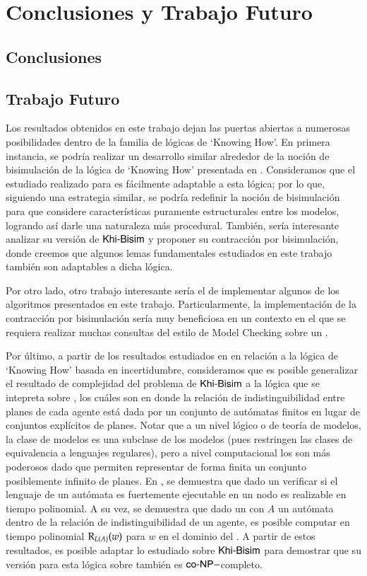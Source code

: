 \chapter{Conclusiones y Trabajo Futuro}

\section{Conclusiones}


\section{Trabajo Futuro}

Los resultados obtenidos en este trabajo dejan las puertas abiertas a numerosas posibilidades dentro de la familia de lógicas de `Knowing How'. 
En primera instancia, se podría realizar un desarrollo similar alrededor de la noción de bisimulación de la lógica de `Knowing How' presentada 
en \cite{Wang15KH,Wang2018GoalDirectedKH}. Consideramos que el estudiado realizado para \KHilogic es fácilmente adaptable a esta lógica; por lo que, siguiendo 
una estrategia similar, se podría redefinir la noción de bisimulación para que considere características puramente estructurales entre los modelos, 
logrando así darle una naturaleza más procedural. También, sería interesante analizar su versión de $\rm\textsf{Khi-Bisim}$ y proponer su contracción 
por bisimulación, donde creemos que algunos lemas fundamentales estudiados en este trabajo también son adaptables a dicha lógica.

Por otro lado, otro trabajo interesante sería el de implementar algunos de los algoritmos presentados en este trabajo. Particularmente, 
la implementación de la contracción por bisimulación sería muy beneficiosa en un contexto en el que se requiera realizar muchas consultas del 
estilo de Model Checking sobre un \ults.

Por último, a partir de los resultados estudiados en \cite{Demri_Fervari_2023} en relación a la lógica de `Knowing How' basada en incertidumbre, 
consideramos que es posible generalizar el resultado de complejidad del problema de $\rm\textsf{Khi-Bisim}$ a la lógica que se intepreta sobre \regults, los 
cuáles son \ults en donde la relación de indistinguibilidad entre planes de cada agente está dada por un conjunto de autómatas finitos en lugar 
de conjuntos explícitos de planes. 
Notar que a un nivel lógico o de teoría de modelos, la clase de modelos \regults es una subclase de los modelos \ults (pues restringen las clases de equivalencia 
a lenguajes regulares), pero a nivel computacional los \regults son más poderosos dado que permiten representar de forma finita un conjunto 
posiblemente infinito de planes. En \cite{Demri_Fervari_2023}, se demuestra que dado un \regults verificar si el lenguaje de un autómata 
es fuertemente ejecutable en un nodo es realizable en tiempo polinomial. A su vez, se demuestra que dado un \regults con $A$ un autómata dentro de la relación de indistinguibilidad de 
un agente, es posible computar en tiempo polinomial $\mathrm{R}_{L(A)}(w)$ para $w$ en el dominio del \regults.
A partir de estos resultados, es posible adaptar lo estudiado sobre $\rm\textsf{Khi-Bisim}$ para demostrar que su versión para 
esta lógica sobre \regults también es $\rm\textsf{co-NP}-$completo.